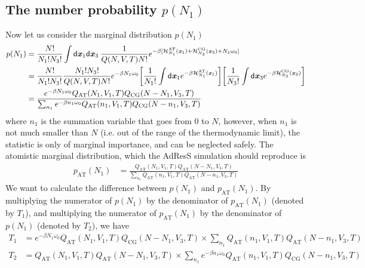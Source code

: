\documentclass[aip,jcp,a4paper,reprint,onecolumn]{revtex4-1}
\newcommand{\vect}[1]{\textbf{\textit{#1}}}
\newcommand{\dd}[1]{\textsf{#1}}
\newcommand{\AT}{{\textrm{{AT}}}}
\newcommand{\CG}{{\textrm{CG}}}
\begin{document}
\subsection{The number probability $p(N_1)$}
Now let us consider the marginal distribution $p(N_1)$
\begin{align}\nonumber
  p(N_1)
  &=
  \frac{N!}{N_1!N_3!}
  \int
  \dd d\vect x_1\dd d\vect x_3  \:
  \frac{1}{Q(N,V,T) N!}
  e^{-\beta
    [\mathcal H_{N_1}^{\AT}(\vect x_1) +
    \mathcal H_{N_3}^{\CG}(\vect x_3) +
    N_1\omega_0]}\\\nonumber
  &=
  \frac{N!}{N_1!N_3!}
  \frac{N_1!N_3!}{Q(N,V,T) N!}
  e^{-\beta N_1\omega_0}
  \bigg[
  \frac1{N_1!}
  \int
  \dd d\vect x_1
  e^{-\beta \mathcal H_{N_1}^{\AT}(\vect x_1)}
  \bigg]
  \bigg[
  \frac1{N_3!}
  \int
  \dd d\vect x_3
  e^{-\beta \mathcal H_{N_3}^{\CG}(\vect x_3)}
  \bigg]  \\\nonumber
  &=
  \frac
  {
    e^{-\beta N_1\omega_0}
    Q_{\AT}(N_1,V_1,T) Q_{\CG}(N-N_1,V_3,T)
  }
  {
    \sum_{n_1}
    e^{-\beta n_1\omega_0}
    Q_{\AT}(n_1,V_1,T) Q_{\CG}(N-n_1,V_3,T)
  }
\end{align}
where $n_1$ is the summation variable that goes from 0 to $N$,
however, when $n_1$ is not much smaller than $N$ (i.e. out of the range of the
thermodynamic limit), the statistic is only of marginal importance,
and can be neglected safely.
The atomistic marginal distribution, which the AdResS simulation should
reproduce is
\begin{align}
  p_{\AT}(N_1)
  &=
  \frac
  {
    Q_{\AT}(N_1,V_1,T) Q_{\AT}(N-N_1,V_3,T)
  }
  {
    \sum_{n_1}
    Q_{\AT}(n_1,V_1,T) Q_{\AT}(N-n_1,V_3,T)
  }  
\end{align}
We want to calculate the difference between $p(N_1)$ and $p_{\AT}(N_1)$.
By multiplying the numerator of $p(N_1)$ by the denominator of
$p_{\AT}(N_1)$ (denoted by $T_1$),
and multiplying the numerator of $p_{\AT}(N_1)$
by the denominator of $p(N_1)$ (denoted by $T_2$), we have
\begin{align}
  T_1
  &=
  e^{-\beta N_1\omega_0}
  Q_{\AT}(N_1,V_1,T) Q_{\CG}(N-N_1,V_3,T)
  \times
  \sum_{n_1}
  Q_{\AT}(n_1,V_1,T) Q_{\AT}(N-n_1,V_3,T)\\
  T_2
  &=
  Q_{\AT}(N_1,V_1,T) Q_{\AT}(N-N_1,V_3,T)
  \times
  \sum_{n_1}
  e^{-\beta n_1\omega_0}
  Q_{\AT}(n_1,V_1,T) Q_{\CG}(N-n_1,V_3,T)
\end{align}
\end{document}

